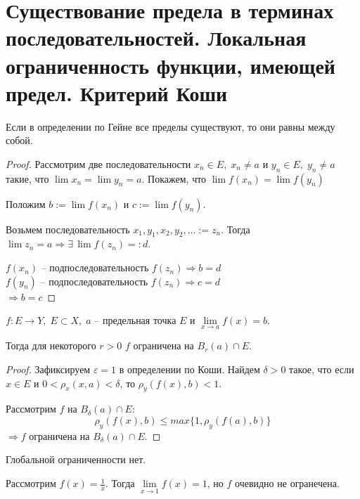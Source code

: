 \section{Существование предела в терминах последовательностей. Локальная ограниченность функции, имеющей предел. Критерий Коши \href{https://youtu.be/BiTNBigkkyU?t=2205}{\Walley}}

\begin{theorem-non}
    Если в определении по Гейне все пределы существуют, то они равны между собой. 
\end{theorem-non}
\begin{proof}
    Рассмотрим две последовательности $x_n \in E, \; x_n \neq a$ и $y_n \in E, \; y_n \neq a$ такие, что $\lim x_n = \lim y_n = a$. Покажем, что $\lim f(x_n) = \lim f(y_n)$
    
    Положим $b := \lim f(x_n)$ и $c := \lim f(y_n)$.

    Возьмем последовательность $x_1, y_1, x_2, y_2, \dots := z_n$. Тогда $\lim z_n = a \Rightarrow \exists \, \lim f(z_n) =: d$.
    
    $f(x_n)$ -- подпоследовательность $f(z_n) \Rightarrow b = d$ \\
    $f(y_n)$ -- подпоследовательность $f(z_n) \Rightarrow c = d$ \\
    $\Rightarrow b = c$
\end{proof}

\begin{theorem-non}
    $f : E \to Y, \; E \subset X, \; a$ -- предельная точка $E$ и $\lim\limits_{x \to a} f(x) = b$. 

    Тогда для некоторого $r > 0$ $f$ ограничена на $B_r(a) \cap E$. 
\end{theorem-non}
\begin{proof}
    Зафиксируем $\varepsilon = 1$ в определении по Коши. Найдем $\delta > 0$ такое, что если $x \in E$ и $0 < \rho_x(x, a) < \delta$, то $\rho_y(f(x), b) < 1$.

    Рассмотрим $f$ на $B_{\delta}(a) \cap E$:
    \[ \rho_y(f(x), b) \leqslant max \{1, \rho_y(f(a), b)\} \]
    $\Rightarrow f$ ограничена на $B_{\delta}(a) \cap E$.
\end{proof}
\begin{notice}
    Глобальной ограниченности нет. 

    Рассмотрим $f(x) = \frac{1}{x}$. Тогда $\lim\limits_{x \to 1} f(x) = 1$, но $f$ очевидно не огранечена.
\end{notice}

\vspace{7mm}

